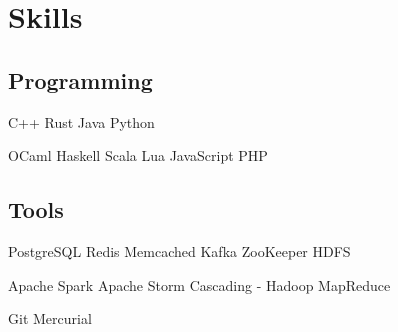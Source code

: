 \documentclass[]{resume}
\begin{document}
\begin{minipage}[t]{0.33\textwidth}
\sectionsep


\section{Skills}

\subsection{Programming}

C++ \textbullet{} Rust \textbullet{} Java \textbullet{} Python

OCaml \textbullet{} Haskell \textbullet{} Scala \textbullet{} Lua \textbullet{} JavaScript \textbullet{} PHP

\sectionsep

\subsection{Tools}

PostgreSQL \textbullet{} Redis \textbullet{} Memcached
\textbullet{} Kafka \textbullet{} ZooKeeper \textbullet{} HDFS

Apache Spark \textbullet{} Apache Storm \textbullet{} Cascading - Hadoop MapReduce

Git \textbullet{} Mercurial

\sectionsep

%
%

\end{minipage}
\hfill
\end{document}
